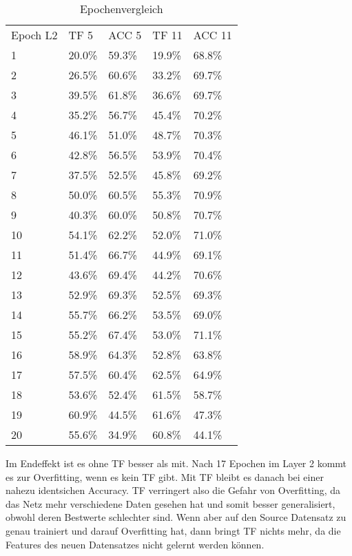     \begin{table}[h!]
        \begin{center}
            \caption{Epochenvergleich}
            \label{tab4:Table}
            \begin{tabular}{l|l|l|l|l}
                Epoch L2 & TF 5 & ACC 5 & TF 11 & ACC 11 \\
                1 & 20.0\% & 59.3\% & 19.9\% & 68.8\% \\
                2 & 26.5\% & 60.6\% & 33.2\% & 69.7\% \\
                3 & 39.5\% & 61.8\% & 36.6\% & 69.7\% \\
                4 & 35.2\% & 56.7\% & 45.4\% & 70.2\% \\
                5 & 46.1\% & 51.0\% & 48.7\% & 70.3\% \\
                6 & 42.8\% & 56.5\% & 53.9\% & 70.4\% \\
                7 & 37.5\% & 52.5\% & 45.8\% & 69.2\% \\
                8 & 50.0\% & 60.5\% & 55.3\% & 70.9\% \\
                9 & 40.3\% & 60.0\% & 50.8\% & 70.7\% \\
                10 & 54.1\% & 62.2\% & 52.0\% & 71.0\% \\
                11 & 51.4\% & 66.7\% & 44.9\% & 69.1\% \\
                12 & 43.6\% & 69.4\% & 44.2\% & 70.6\% \\
                13 & 52.9\% & 69.3\% & 52.5\% & 69.3\% \\
                14 & 55.7\% & 66.2\% & 53.5\% & 69.0\% \\
                15 & 55.2\% & 67.4\% & 53.0\% & 71.1\% \\
                16 & 58.9\% & 64.3\% & 52.8\% & 63.8\% \\
                17 & 57.5\% & 60.4\% & 62.5\% & 64.9\% \\
                18 & 53.6\% & 52.4\% & 61.5\% & 58.7\% \\
                19 & 60.9\% & 44.5\% & 61.6\% & 47.3\% \\
                20 & 55.6\% & 34.9\% & 60.8\% & 44.1\% \\
            \end{tabular}
        \end{center}
    \end{table}

    Im Endeffekt ist es ohne TF besser als mit.
    Nach 17 Epochen im Layer 2 kommt es zur Overfitting, wenn 
    es kein TF gibt. Mit TF bleibt es danach bei einer nahezu 
    identsichen Accuracy. TF verringert also die Gefahr von 
    Overfitting, da das Netz mehr verschiedene Daten gesehen 
    hat und somit besser generalisiert, obwohl deren Bestwerte 
    schlechter sind. 
    Wenn aber auf den Source Datensatz zu genau trainiert und darauf 
    Overfitting hat, dann bringt TF nichts mehr, da die Features 
    des neuen Datensatzes nicht gelernt werden können. 

